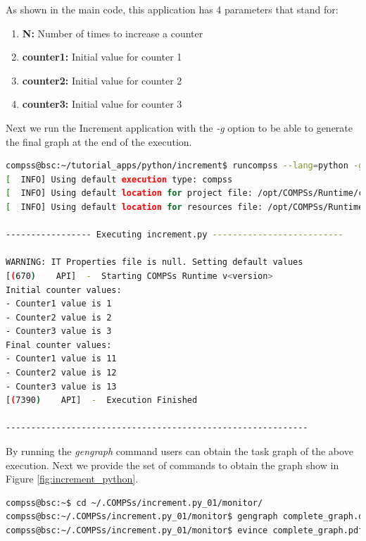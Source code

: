 As shown in the main code, this application has 4 parameters that stand for:

\begin{enumerate}
 \item \textbf{N:} Number of times to increase a counter
 \item \textbf{counter1:} Initial value for counter 1
 \item \textbf{counter2:} Initial value for counter 2
 \item \textbf{counter3:} Initial value for counter 3
\end{enumerate}

Next we run the Increment application with the \textit{-g} option to be able to generate the final graph at the end of the execution.

\begin{lstlisting}[language=bash]
compss@bsc:~/tutorial_apps/python/increment$ runcompss --lang=python -g ~/tutorial_apps/python/increment/increment.py 10 1 2 3
[  INFO] Using default execution type: compss
[  INFO] Using default location for project file: /opt/COMPSs/Runtime/configuration/xml/projects/default_project.xml
[  INFO] Using default location for resources file: /opt/COMPSs/Runtime/configuration/xml/resources/default_resources.xml

----------------- Executing increment.py --------------------------

WARNING: IT Properties file is null. Setting default values
[(670)    API]  -  Starting COMPSs Runtime v<version>
Initial counter values:
- Counter1 value is 1
- Counter2 value is 2
- Counter3 value is 3
Final counter values:
- Counter1 value is 11
- Counter2 value is 12
- Counter3 value is 13
[(7390)    API]  -  Execution Finished

------------------------------------------------------------
\end{lstlisting}

By running the \textit{gengraph} command users can obtain the task graph of the above execution. Next we provide the set of commands
to obtain the graph show in Figure \ref{fig:increment_python}.

\begin{lstlisting}[language=bash]
compss@bsc:~$ cd ~/.COMPSs/increment.py_01/monitor/
compss@bsc:~/.COMPSs/increment.py_01/monitor$ gengraph complete_graph.dot
compss@bsc:~/.COMPSs/increment.py_01/monitor$ evince complete_graph.pdf
\end{lstlisting}

